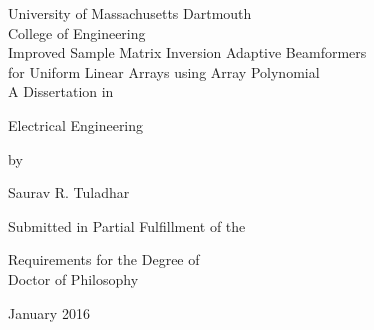 
\thispagestyle{empty}
\doublespacing
\begin{center}

University of Massachusetts Dartmouth \\
College of Engineering \\


\vspace*{5em}
{\sc Improved Sample Matrix Inversion Adaptive Beamformers \\for Uniform Linear Arrays using Array Polynomial} \\

\vspace*{5em}
A Dissertation in 

Electrical Engineering 

by

Saurav R. Tuladhar 

\vspace*{7em}
Submitted in Partial Fulfillment of the 

Requirements for the Degree of \\ Doctor of Philosophy 

\vfill
January 2016

\end{center}
\restoregeometry
